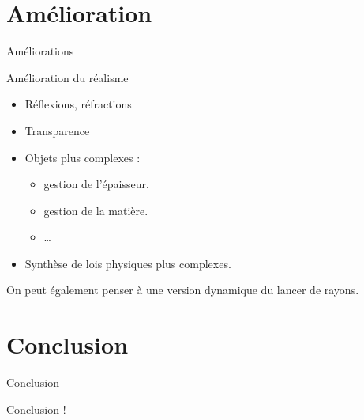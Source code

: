 \documentclass{beamer}
\begin{document}
	\section{Amélioration}
		\begin{frame}{Améliorations}
			\begin{block}{Amélioration du réalisme}
				\begin{itemize}
					
					\item Réflexions, réfractions
					\item Transparence	
					\item Objets plus complexes :
					\begin{itemize}
						\item gestion de l'épaisseur.
						\item gestion de la matière.
						\item \dots
					\end{itemize}
					\item Synthèse de lois physiques plus complexes.
				\end{itemize}
			\end{block}
					
		On peut également penser à une version \og dynamique \fg du lancer de rayons.
		\end{frame}








\section{Conclusion}
	
	\begin{frame}{Conclusion}
		\begin{center}		
			Conclusion !
		\end{center}
	\end{frame}
	
\end{document}

